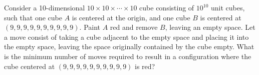 Consider a 10-dimensional \(10 \times 10 \times \cdots \times 10 \) cube consisting of \(10^{10}\) unit cubes, such that one cube \(A\) is centered at the origin, and one cube \(B\) is centered at \((9, 9, 9, 9, 9, 9, 9, 9, 9, 9)\). Paint \(A\) red and remove \(B\),  leaving an empty space. Let a move consist of taking a cube adjacent to the empty space and placing it into the empty space, leaving the space originally contained by the cube empty. What is the minimum number of moves required to result in a configuration where the cube centered at \((9, 9, 9, 9, 9, 9, 9, 9, 9, 9)\) is red?